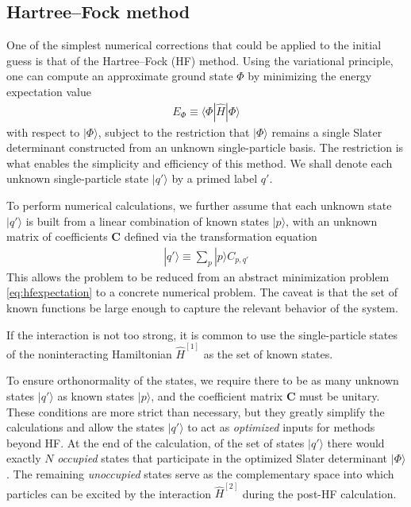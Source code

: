 \subsection{Hartree--Fock method}
\label{subsec:HartreeFockmethod}

One of the simplest numerical corrections that could be applied to the initial guess is that of the Hartree--Fock (HF) method.  Using the variational principle, one can compute an approximate ground state $\Phi$ by minimizing the energy expectation value
\begin{align} \label{eq:hfexpectation}
  E_{\Phi} \equiv \langle \Phi | \hat H | \Phi \rangle
\end{align}
with respect to $|\Phi\rangle$, subject to the restriction that $|\Phi\rangle$ remains a single Slater determinant constructed from an unknown single-particle basis.  The restriction is what enables the simplicity and efficiency of this method.  We shall denote each unknown single-particle state $|q'\rangle$ by a primed label $q'$.

To perform numerical calculations, we further assume that each unknown state $|q'\rangle$ is built from a linear combination of known states $|p\rangle$, with an unknown matrix of coefficients $\bm C$ defined via the transformation equation
\begin{align*}
  |q'\rangle \equiv \sum_p |p\rangle C_{p, q'}
\end{align*}
This allows the problem to be reduced from an abstract minimization problem \eqref{eq:hfexpectation} to a concrete numerical problem.  The caveat is that the set of known functions be large enough to capture the relevant behavior of the system.

If the interaction is not too strong, it is common to use the single-particle states of the noninteracting Hamiltonian $\hat{H}^{[1]}$ as the set of known states.

To ensure orthonormality of the states, we require there to be as many unknown states $|q'\rangle$ as known states $|p\rangle$, and the coefficient matrix $\bm C$ must be unitary.  These conditions are more strict than necessary, but they greatly simplify the calculations and allow the states $|q'\rangle$ to act as \textit{optimized} inputs for methods beyond HF.  At the end of the calculation, of the set of states $|q'\rangle$ there would exactly $N$ \textit{occupied} states that participate in the optimized Slater determinant $|\Phi\rangle$.  The remaining \textit{unoccupied} states serve as the complementary space into which particles can be excited by the interaction $\hat{H}^{[2]}$ during the post-HF calculation.

